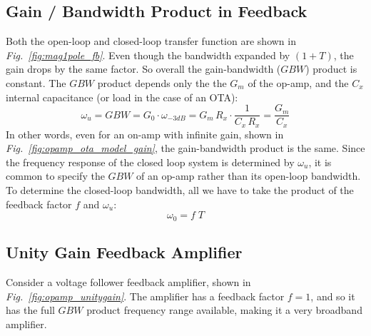 \subsection{Gain / Bandwidth Product in Feedback}
Both the open-loop and closed-loop transfer function are shown in \emph{Fig.~\ref{fig:mag1pole_fb}}.  Even though the bandwidth expanded by $(1 + T)$, the gain drops by the same factor. So overall the gain-bandwidth ($GBW$) product is constant. The $GBW$ product depends only the the $G_m$ of the op-amp, and the $C_x$ internal capacitance (or load in the case of an OTA):
    \begin{equation}
        \omega_u = GBW = G_0 \cdot \omega_{-3dB}  = G_m\,R_x \cdot \frac{1}{C_x\,R_x} = \frac{G_m}{C_x}
    \end{equation} 
In other words, even for an on-amp with infinite gain, shown in \emph{Fig.~\ref{fig:opamp_ota_model_gain}}, the gain-bandwidth product is the same.  Since the frequency response of the closed loop system is determined by $\omega_u$, it is common to specify the $GBW$ of an op-amp rather than its open-loop bandwidth.  To determine the closed-loop bandwidth, all we have to take the product of the feedback factor $f$ and $\omega_u$:
    \begin{equation}
        \omega_0 = f\;T
    \end{equation} 
\subsection{Unity Gain Feedback Amplifier}
Consider a voltage follower feedback amplifier, shown in \emph{Fig.~\ref{fig:opamp_unitygain}}.  The amplifier has a feedback factor $f = 1$, and so it has the full $GBW$ product frequency range available, making it a very broadband amplifier.
